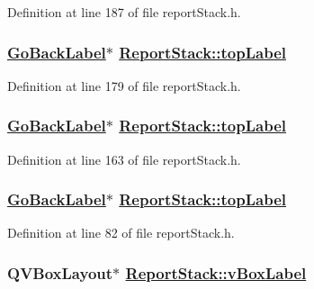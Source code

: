 Definition at line 187 of file report\-Stack.h.\hypertarget{classReportStack_r97}{
\subsubsection[topLabel]{\setlength{\rightskip}{0pt plus 5cm}\hyperlink{classGoBackLabel}{Go\-Back\-Label}$\ast$ \hyperlink{classReportStack_r11}{Report\-Stack::top\-Label}}}
\label{classReportStack_r97}


Definition at line 179 of file report\-Stack.h.\hypertarget{classReportStack_r83}{
\subsubsection[topLabel]{\setlength{\rightskip}{0pt plus 5cm}\hyperlink{classGoBackLabel}{Go\-Back\-Label}$\ast$ \hyperlink{classReportStack_r11}{Report\-Stack::top\-Label}}}
\label{classReportStack_r83}


Definition at line 163 of file report\-Stack.h.\hypertarget{classReportStack_r11}{
\subsubsection[topLabel]{\setlength{\rightskip}{0pt plus 5cm}\hyperlink{classGoBackLabel}{Go\-Back\-Label}$\ast$ \hyperlink{classReportStack_r11}{Report\-Stack::top\-Label}}}
\label{classReportStack_r11}


Definition at line 82 of file report\-Stack.h.\hypertarget{classReportStack_r9}{
\subsubsection[vBoxLabel]{\setlength{\rightskip}{0pt plus 5cm}QVBox\-Layout$\ast$ \hyperlink{classReportStack_r9}{Report\-Stack::v\-Box\-Label}}}
\label{classReportStack_r9}


